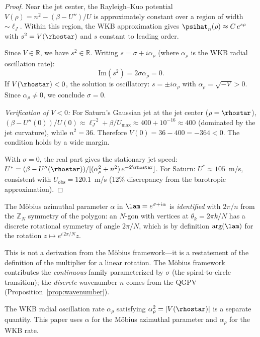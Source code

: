 \begin{proof}
Near the jet center, the Rayleigh--Kuo potential
$V(\rho) = n^2 - (\beta - U'')/U$ is approximately constant over a
region of width $\sim \ell_J$.  Within this region, the WKB approximation
gives $\psihat_n(\rho) \approx C\,e^{s\rho}$ with $s^2 = V(\rhostar)$
and $s$ constant to leading order.

Since $V \in \mathbb{R}$, we have $s^2 \in \mathbb{R}$.  Writing
$s = \sigma + i\alpha_\rho$ (where $\alpha_\rho$ is the WKB radial
oscillation rate):
\[
  \mathrm{Im}(s^2) = 2\sigma\alpha_\rho = 0.
\]
If $V(\rhostar) < 0$, the solution is oscillatory: $s = \pm i\alpha_\rho$
with $\alpha_\rho = \sqrt{-V} > 0$.  Since $\alpha_\rho \neq 0$, we
conclude $\sigma = 0$.

\emph{Verification of $V < 0$:}  For Saturn's Gaussian jet at the jet
center ($\rho = \rhostar$), $(\beta - U''(0))/U(0) \approx
\ell_J^{-2} + \beta/U_{\max} \approx 400 + 10^{-16} \approx 400$
(dominated by the jet curvature), while $n^2 = 36$.  Therefore
$V(0) = 36 - 400 = -364 < 0$.  The condition holds by a wide margin.

With $\sigma = 0$, the real part gives the stationary jet speed:
$U^* = (\beta - U''(\rhostar)) / [(\alpha_\rho^2 + n^2)\,e^{-2\rhostar}]$.
For Saturn: $U^* \approx 105$~m/s, consistent with
$U_{\mathrm{obs}} = 120.1$~m/s \citep{Antunano2015}
(12\% discrepancy from the barotropic approximation).
\end{proof}

\begin{remark}[The identification $\alpha = 2\pi/n$]\label{rem:alpha}
The M\"obius azimuthal parameter $\alpha$ in $\lam = e^{\sigma + i\alpha}$
is \emph{identified} with $2\pi/n$ from the $\mathbb{Z}_N$ symmetry of
the polygon: an $N$-gon with vertices at $\theta_k = 2\pi k/N$ has a
discrete rotational symmetry of angle $2\pi/N$, which is by definition
$\arg(\lam)$ for the rotation $z \mapsto e^{i\,2\pi/N} z$.

This is not a derivation from the M\"obius framework---it is a restatement
of the definition of the multiplier for a linear rotation.  The M\"obius
framework contributes the \emph{continuous} family parameterized by
$\sigma$ (the spiral-to-circle transition); the \emph{discrete}
wavenumber $n$ comes from the QGPV (Proposition~\ref{prop:wavenumber}).

The WKB radial oscillation rate $\alpha_\rho$ satisfying
$\alpha_\rho^2 = |V(\rhostar)|$ is a separate quantity.  This paper
uses $\alpha$ for the M\"obius azimuthal parameter and $\alpha_\rho$ for
the WKB rate.
\end{remark}

